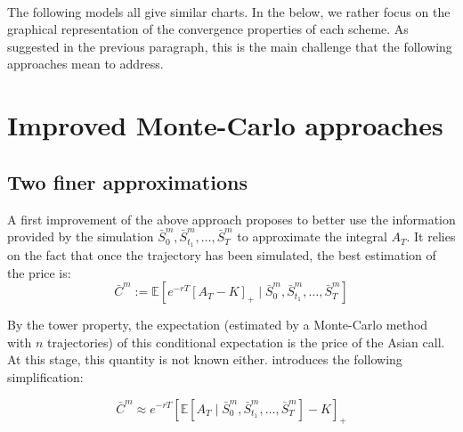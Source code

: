 \documentclass{article}
\begin{document}
\

The following models all give similar charts. In the below, we rather focus on the graphical representation
of the convergence properties of each scheme. As suggested in the previous paragraph, this is
the main challenge that the following approaches mean to address.

\section{Improved Monte-Carlo approaches}
\subsection{Two finer approximations}

A first improvement of the above approach proposes to better use the information provided by the simulation
$\bar S_0^m, \bar S_{t_1}^m, \dots, \bar S_T^m$ to approximate the integral $A_T$.
It relies on the fact that once the trajectory has been simulated, the best estimation of the price is:
\[
	\bar C^m := \mathbb E \left[ e^{-rT} \left[ A_T - K \right]_+ \mid \bar S_0^m, \bar S_{t_1}^m, \dots, \bar S_T^m \right]
\]

By the tower property, the expectation (estimated by a Monte-Carlo method with $n$ trajectories)
of this conditional expectation is the price of the Asian call.
At this stage, this quantity is not known either. \cite{main} introduces the following simplification:

\begin{equation}
	\bar C^m \approx e^{-rT}  \left[ \mathbb E \left[A_T
		\mid \bar S_0^m, \bar S_{t_1}^m, \dots, \bar S_T^m \right] - K \right]_+
	\tag{S}
\end{equation}
\end{document}

